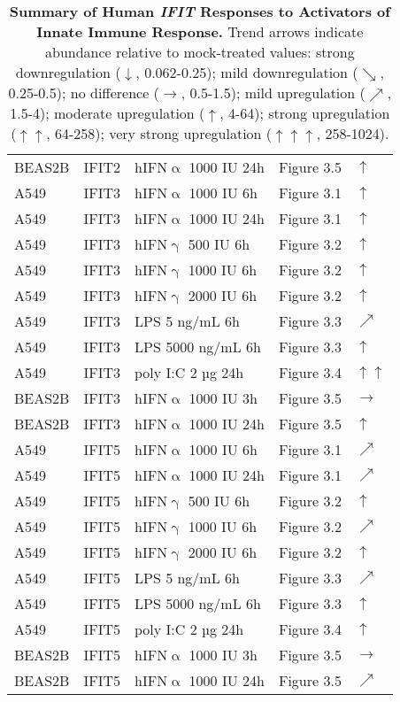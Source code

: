 \begin{table}
\begin{tabular}{lllll}
        BEAS2B & IFIT2 & hIFN$\upalpha$ 1000 IU 24h & Figure 3.5 & \(\uparrow\) \\ 
        A549 & IFIT3 & hIFN$\upalpha$ 1000 IU 6h & Figure 3.1 & \(\uparrow\) \\ 
        A549 & IFIT3 & hIFN$\upalpha$ 1000 IU 24h & Figure 3.1 & \(\uparrow\) \\ 
        A549 & IFIT3 & hIFN$\upgamma$ 500 IU 6h & Figure 3.2 & \(\uparrow\) \\ 
        A549 & IFIT3 & hIFN$\upgamma$ 1000 IU 6h & Figure 3.2 & \(\uparrow\) \\ 
        A549 & IFIT3 & hIFN$\upgamma$ 2000 IU 6h & Figure 3.2 & \(\uparrow\) \\ 
        A549 & IFIT3 & LPS 5 ng/mL 6h & Figure 3.3 & \(\nearrow\) \\ 
        A549 & IFIT3 & LPS 5000 ng/mL 6h & Figure 3.3 & \(\uparrow\) \\ 
        A549 & IFIT3 & poly I:C 2 µg 24h & Figure 3.4 & \(\uparrow\)\(\uparrow\) \\ 
        BEAS2B & IFIT3 & hIFN$\upalpha$ 1000 IU 3h & Figure 3.5 & \(\rightarrow\) \\ 
        BEAS2B & IFIT3 & hIFN$\upalpha$ 1000 IU 24h & Figure 3.5 & \(\uparrow\) \\ 
        A549 & IFIT5 & hIFN$\upalpha$ 1000 IU 6h & Figure 3.1 & \(\nearrow\) \\ 
        A549 & IFIT5 & hIFN$\upalpha$ 1000 IU 24h & Figure 3.1 & \(\nearrow\) \\ 
        A549 & IFIT5 & hIFN$\upgamma$ 500 IU 6h & Figure 3.2 & \(\uparrow\) \\ 
        A549 & IFIT5 & hIFN$\upgamma$ 1000 IU 6h & Figure 3.2 & \(\nearrow\) \\ 
        A549 & IFIT5 & hIFN$\upgamma$ 2000 IU 6h & Figure 3.2 & \(\uparrow\) \\ 
        A549 & IFIT5 & LPS 5 ng/mL 6h & Figure 3.3 & \(\nearrow\) \\ 
        A549 & IFIT5 & LPS 5000 ng/mL 6h & Figure 3.3 & \(\uparrow\) \\ 
        A549 & IFIT5 & poly I:C 2 µg 24h & Figure 3.4 & \(\uparrow\) \\ 
        BEAS2B & IFIT5 & hIFN$\upalpha$ 1000 IU 3h & Figure 3.5 & \(\rightarrow\) \\ 
        BEAS2B & IFIT5 & hIFN$\upalpha$ 1000 IU 24h & Figure 3.5 & \(\nearrow\) \\ \hline
    \end{tabular}
    \caption[Summary of Human \textit{IFIT} Responses to Activators of Innate Immune Response.]{\textbf{Summary of Human \textit{IFIT} Responses to Activators of Innate Immune Response.} Trend arrows indicate abundance relative to mock-treated values: strong downregulation ($\downarrow$, 0.062-0.25); mild downregulation ($\searrow$, 0.25-0.5); no difference ($\rightarrow$, 0.5-1.5); mild upregulation ($\nearrow$, 1.5-4); moderate upregulation ($\uparrow$, 4-64); strong upregulation ($\uparrow\uparrow$, 64-258); very strong upregulation ($\uparrow\uparrow\uparrow$, 258-1024).}
    \label{tab:Summary of Human IFIT Responses to Activators of Innate Immune Response.}
\end{table}

